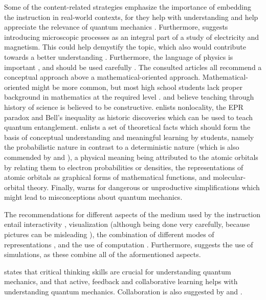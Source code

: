 \documentclass[11pt,twoside]{report} %
\begin{document}
Some of the content-related strategies emphasize the importance of embedding the instruction in real-world contexts, for they help with understanding \cite{mckagan,thacker,dori} and help appreciate the relevance of quantum mechanics \cite{mckagan,henriksen,barnes}. Furthermore,  suggests introducing microscopic processes as an integral part of a study of electricity and magnetism. This could help demystify the topic, which also would contribute towards a better understanding \cite{muller,barnes}. Furthermore, the language of physics is important \cite{henriksen}, and should be used carefully \cite{mckagan}. The consulted articles all recommend a conceptual approach above a mathematical-oriented approach. Mathematical-oriented might be more common, but most high school students lack proper background in mathematics at the required level \cite{dori}.  and  believe teaching through history of science is believed to be constructive.  enlists nonlocality, the EPR paradox and Bell's inequality as historic discoveries which can be used to teach quantum entanglement. \cite{papaphotis2} enlists a set of theoretical facts which should form the basis of conceptual understanding and meaningful learning by students, namely the probabilistic nature in contrast to a deterministic nature (which is also commended by  and ), a physical meaning being attributed to the atomic orbitals by relating them to electron probabilities or densities, the representations of atomic orbitals as graphical forms of mathematical functions, and molecular-orbital theory. Finally,  warns for dangerous or unproductive simplifications which might lead to misconceptions about quantum mechanics.

The recommendations for different aspects of the medium used by the instruction entail interactivity \cite{mckagan,dori,adegoke,asikainen}, visualization \cite{mckagan,dori,henriksen} (although being done very carefully, because pictures can be misleading \cite{levrini}), the combination of different modes of representations \cite{dori}, and the use of computation \cite{mckagan,barnes,velentzas}. Furthermore,  suggests the use of simulations, as these combine all of the aformentioned aspects.

 states that critical thinking skills are crucial for understanding quantum mechanics, and that active, feedback and collaborative learning helps with understanding quantum mechanics. Collaboration is also suggested by  and . 
\end{document}
